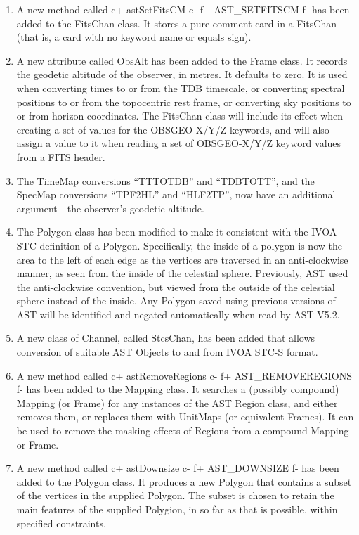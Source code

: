\documentclass[twoside,11pt]{starlink}
\begin{document}
\begin{enumerate}

\item A new method called
c+
astSetFitsCM
c-
f+
AST\_SETFITSCM
f-
has been added to the FitsChan class. It stores a pure comment card in a
FitsChan (that is, a card with no keyword name or equals sign).

\item A new attribute called ObsAlt has been added to the Frame class. It
records the geodetic altitude of the observer, in metres. It defaults to
zero. It is used when converting times to or from the TDB timescale, or
converting spectral positions to or from the topocentric rest frame, or
converting sky positions to or from horizon coordinates. The FitsChan
class will include its effect when creating a set of values for the
OBSGEO-X/Y/Z keywords, and will also assign a value to it when reading a
set of OBSGEO-X/Y/Z keyword values from a FITS header.

\item The TimeMap conversions ``TTTOTDB'' and ``TDBTOTT'', and the SpecMap
conversions ``TPF2HL'' and ``HLF2TP'', now have an additional argument -
the observer's geodetic altitude.

\item The Polygon class has been modified to make it consistent with the
IVOA STC definition of a Polygon. Specifically, the inside of a polygon
is now the area to the left of each edge as the vertices are traversed in
an anti-clockwise manner, as seen from the inside of the celestial sphere.
Previously, AST used the anti-clockwise convention, but viewed from the
outside of the celestial sphere instead of the inside. Any Polygon saved
using previous versions of AST will be identified and negated automatically
when read by AST V5.2.

\item A new class of Channel, called StcsChan, has been added that allows
conversion of suitable AST Objects to and from IVOA STC-S format.

\item A new method called
c+
astRemoveRegions
c-
f+
AST\_REMOVEREGIONS
f-
has been added to the Mapping class. It searches a (possibly compound)
Mapping (or Frame) for any instances of the AST Region class, and either
removes them, or replaces them with UnitMaps (or equivalent Frames). It
can be used to remove the masking effects of Regions from a compound
Mapping or Frame.

\item A new method called
c+
astDownsize
c-
f+
AST\_DOWNSIZE
f-
has been added to the Polygon class. It produces a new Polygon that
contains a subset of the vertices in the supplied Polygon. The subset is
chosen to retain the main features of the supplied Polygion, in so far
as that is possible, within specified constraints.


\end{enumerate}
\end{document}
